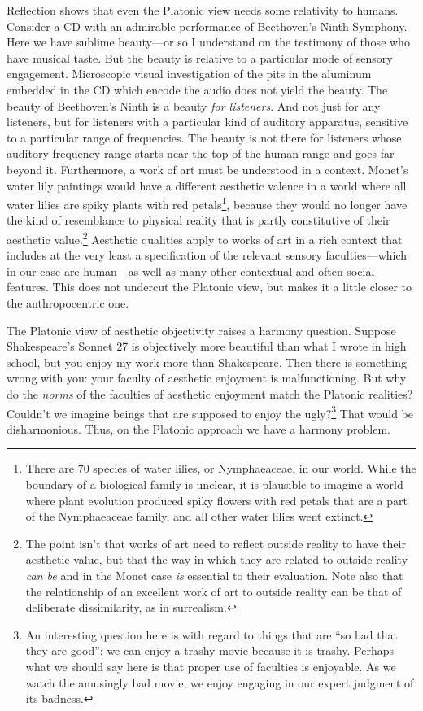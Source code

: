 Reflection shows that even the Platonic view needs some relativity to humans. Consider a CD with an admirable performance of Beethoven's Ninth Symphony.
Here we have sublime beauty---or so I understand on the testimony of those who have musical taste. But
the beauty is relative to a particular mode of sensory engagement. Microscopic visual investigation of the 
pits in the aluminum embedded in the CD which encode the audio does not yield the beauty. The beauty of
Beethoven's Ninth is a beauty \textit{for listeners}. And not just for any listeners, but for listeners
with a particular kind of auditory apparatus, sensitive to a particular range of frequencies. The beauty
is not there for listeners whose auditory frequency range starts near the top of the human range and goes far 
beyond it. Furthermore, a work of art must be understood in a context. Monet's water lily paintings would
have a different aesthetic valence in a world where all water lilies are spiky plants with red petals\footnote{There 
are 70 species of water lilies, or Nymphaeaceae, in our world. While the boundary of a biological family is 
unclear, it is plausible to imagine a world where plant evolution produced spiky flowers with red petals
that are a part of the  Nymphaeaceae family, and all other water lilies went extinct.}, because they would
no longer have the kind of resemblance to physical reality that is partly constitutive of their aesthetic
value.\footnote{The point isn't that works of art need to reflect outside reality to have their aesthetic
value, but that the way in which they are related to outside reality \textit{can be} and in the Monet case
\textit{is} essential to their evaluation. Note also that the relationship of an excellent work of art to outside 
reality can be that of deliberate dissimilarity, as in surrealism.} Aesthetic qualities apply to works of
art in a rich context that includes at the very least a specification of the relevant sensory faculties---which
in our case are human---as well as many other contextual and often social features. This does not undercut
the Platonic view, but makes it a little closer to the anthropocentric one.

The Platonic view of aesthetic objectivity raises a harmony question. Suppose Shakespeare's Sonnet 27
is objectively more beautiful than what I wrote in high school, but you enjoy my work more than 
Shakespeare. Then there is something wrong with you: your faculty of aesthetic enjoyment is malfunctioning.
But why do the \textit{norms} of the faculties of aesthetic enjoyment match the Platonic realities?
Couldn't we imagine beings that are supposed to enjoy the ugly?\footnote{An interesting question here is 
with regard to things that are ``so bad that they are good'': we can enjoy a trashy movie because it is
trashy. Perhaps what we should say here is that proper use of faculties is enjoyable. As we watch the
amusingly bad movie, we enjoy engaging in our expert judgment of its badness.} That would be disharmonious.
Thus, on the Platonic approach we have a harmony problem.

